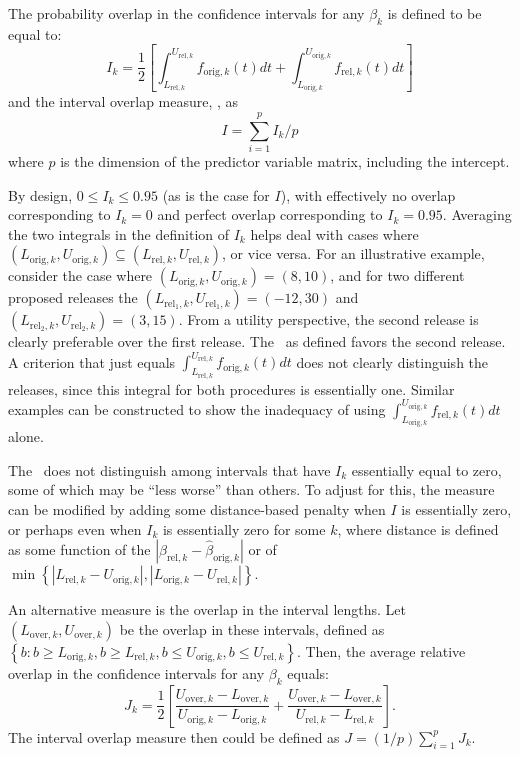 \documentclass[12pt]{article}
\begin{document}
The probability overlap in the confidence intervals for
any $\beta_{k}$ \citep{kkors06} is defined to be equal to:
\begin{equation}
I_k = \frac{1}{2}
\left[\int_{L_{\mathrm{rel},k}}^{U_{\mathrm{rel},k}}
f_{\mathrm{orig},k}(t) dt +
\int_{L_{\mathrm{orig},k}}^{U_{\mathrm{orig},k}}
f_{\mathrm{rel},k}(t) dt \right]
\end{equation}
and the interval overlap measure, \IO, as
\begin{equation}
I = \sum_{i=1}^p I_k / p
\end{equation}
where $p$ is the dimension of the predictor variable matrix, including
the intercept.

By design, $0 \leq I_k \leq 0.95$ (as is the case for $I$), with
effectively no overlap corresponding to $I_k =0$ and perfect
overlap corresponding to $I_k = 0.95$.  Averaging the two
integrals in the definition of $I_k$ helps deal with cases where
$(L_{\mathrm{orig},k}, U_{\mathrm{orig},k}) \subseteq
(L_{\mathrm{rel},k}, U_{\mathrm{rel},k})$, or vice versa.  For an
illustrative example, consider the case where
$(L_{\mathrm{orig},k}, U_{\mathrm{orig},k}) = (8, 10)$, and for
two different proposed releases the $(L_{\mathrm{rel_1},k},
U_{\mathrm{rel_1},k})=(-12, 30)$ and $(L_{\mathrm{rel_2},k},
U_{\mathrm{rel_2},k})=(3, 15)$. From a utility perspective, the
second release is clearly preferable over the first release. The
\IO\ as defined favors the second release.  A criterion that just
equals $\int_{L_{\mathrm{rel},k}}^{U_{\mathrm{rel},k}}
f_{\mathrm{orig},k}(t) dt$ does not clearly distinguish the
releases, since this integral for both procedures is essentially
one. Similar examples can be constructed to show the inadequacy of
using $\int_{L_{\mathrm{orig},k}}^{U_{\mathrm{orig},k}}
f_{\mathrm{rel},k}(t) dt$ alone.

The \IO\ does not distinguish among intervals that have $I_k$
essentially equal to zero, some of which may be ``less worse''
than others. To adjust for this, the measure can be modified by
adding some distance-based penalty when $I$ is essentially zero,
or perhaps even when $I_k$ is essentially zero for some $k$, where
distance is defined as some function of the
$|\hat{\beta}_{\mathrm{rel},k} - \hat{\beta}_{\mathrm{orig},k}|$
or of $\min\left\{|L_{\mathrm{rel},k} - U_{\mathrm{orig},k}|,
|L_{\mathrm{orig},k} - U_{\mathrm{rel},k}|\right\}$.

An alternative measure is the overlap in the interval lengths. Let
$(L_{\mathrm{over},k}, U_{\mathrm{over},k})$ be the overlap in
these intervals, defined as $\left\{b: b \geq L_{\mathrm{orig},k},
b \geq L_{\mathrm{rel},k},  b \leq U_{\mathrm{orig},k},  b \leq
U_{\mathrm{rel},k}\right\}$. Then, the average relative overlap in
the confidence intervals for any $\beta_{k}$ equals:
\begin{equation}
J_k = \frac{1}{2} \left[\frac{U_{\mathrm{over},k} -
L_{\mathrm{over},k}}{U_{\mathrm{orig},k} - L_{\mathrm{orig},k}} +
\frac{U_{\mathrm{over},k} -
L_{\mathrm{over},k}}{U_{\mathrm{rel},k} -
L_{\mathrm{rel},k}}\right].
\end{equation}
The interval overlap measure then could be defined as $J = (1/p)
\sum_{i=1}^p J_k$.
\end{document}
